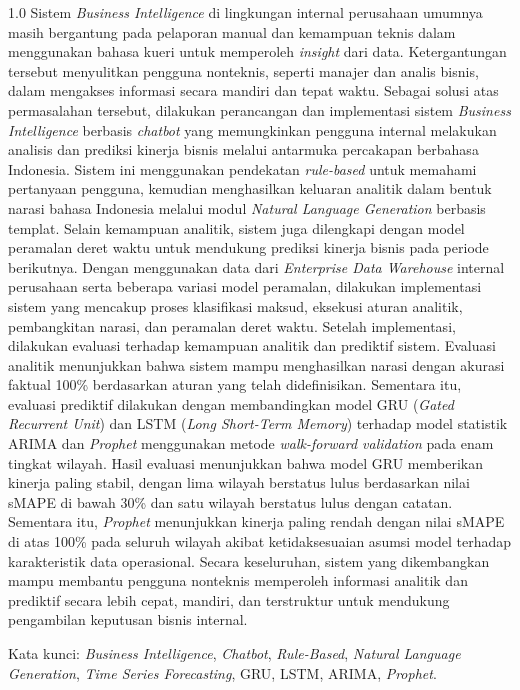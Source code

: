 \begin{spacing}{1.0}
Sistem \textit{Business Intelligence} di lingkungan internal perusahaan umumnya masih bergantung pada pelaporan manual dan kemampuan teknis dalam menggunakan bahasa kueri untuk memperoleh \textit{insight} dari data. Ketergantungan tersebut menyulitkan pengguna nonteknis, seperti manajer dan analis bisnis, dalam mengakses informasi secara mandiri dan tepat waktu. Sebagai solusi atas permasalahan tersebut, dilakukan perancangan dan implementasi sistem \textit{Business Intelligence} berbasis \textit{chatbot} yang memungkinkan pengguna internal melakukan analisis dan prediksi kinerja bisnis melalui antarmuka percakapan berbahasa Indonesia. Sistem ini menggunakan pendekatan \textit{rule-based} untuk memahami pertanyaan pengguna, kemudian menghasilkan keluaran analitik dalam bentuk narasi bahasa Indonesia melalui modul \textit{Natural Language Generation} berbasis templat. Selain kemampuan analitik, sistem juga dilengkapi dengan model peramalan deret waktu untuk mendukung prediksi kinerja bisnis pada periode berikutnya. Dengan menggunakan data dari \textit{Enterprise Data Warehouse} internal perusahaan serta beberapa variasi model peramalan, dilakukan implementasi sistem yang mencakup proses klasifikasi maksud, eksekusi aturan analitik, pembangkitan narasi, dan peramalan deret waktu. Setelah implementasi, dilakukan evaluasi terhadap kemampuan analitik dan prediktif sistem. Evaluasi analitik menunjukkan bahwa sistem mampu menghasilkan narasi dengan akurasi faktual 100\% berdasarkan aturan yang telah didefinisikan. Sementara itu, evaluasi prediktif dilakukan dengan membandingkan model GRU (\textit{Gated Recurrent Unit}) dan LSTM (\textit{Long Short-Term Memory}) terhadap model statistik ARIMA dan \textit{Prophet} menggunakan metode \textit{walk-forward validation} pada enam tingkat wilayah. Hasil evaluasi menunjukkan bahwa model GRU memberikan kinerja paling stabil, dengan lima wilayah berstatus lulus berdasarkan nilai sMAPE di bawah 30\% dan satu wilayah berstatus lulus dengan catatan. Sementara itu, \textit{Prophet} menunjukkan kinerja paling rendah dengan nilai sMAPE di atas 100\% pada seluruh wilayah akibat ketidaksesuaian asumsi model terhadap karakteristik data operasional. Secara keseluruhan, sistem yang dikembangkan mampu membantu pengguna nonteknis memperoleh informasi analitik dan prediktif secara lebih cepat, mandiri, dan terstruktur untuk mendukung pengambilan keputusan bisnis internal.

Kata kunci: \textit{Business Intelligence}, \textit{Chatbot}, \textit{Rule-Based}, \textit{Natural Language Generation}, \textit{Time Series Forecasting}, GRU, LSTM, ARIMA, \textit{Prophet}.
\end{spacing}